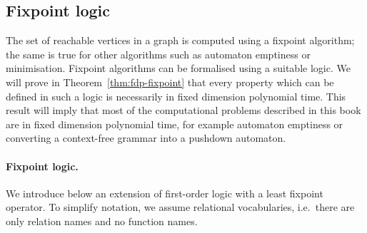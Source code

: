 \subsection*{Fixpoint logic}
The set of reachable vertices in a graph is computed using a fixpoint algorithm; the same is true for other algorithms such as automaton emptiness or minimisation. Fixpoint algorithms can be formalised using a suitable logic. We will prove in Theorem~\ref{thm:fdp-fixpoint} that every property which can be defined in such a logic is necessarily in fixed dimension polynomial time. This result will imply that most of the computational problems described in this book are in fixed dimension polynomial time, for example automaton emptiness or converting a context-free grammar into a pushdown automaton. 

\paragraph*{Fixpoint logic.} We introduce below an extension of first-order logic with a least fixpoint operator. To simplify notation, we assume relational vocabularies, i.e.~there are only relation names and no function names. 

